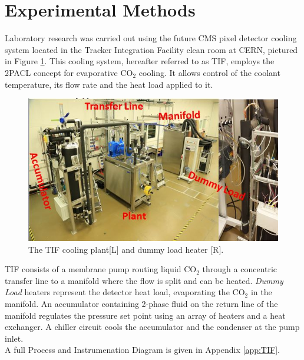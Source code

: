 \documentclass{report}
\begin{document}
\section{Experimental Methods}
\FloatBarrier
Laboratory research was carried out using the future CMS pixel detector cooling system located in the Tracker Integration Facility clean room at CERN, pictured in Figure \ref{fig:TIF}. This cooling system, hereafter referred to as TIF, employs the 2PACL concept for evaporative CO$_2$ cooling. It allows control of the coolant temperature, its flow rate and the heat load applied to  it. \\
\begin{figure}[h]
\includegraphics[width=\textwidth]{TIFandHeater.jpg}
\caption{The TIF cooling plant[L] and dummy load heater [R]. \cite{tif web}}
\label{fig:TIF}
\end{figure}
TIF consists of a membrane pump routing liquid CO$_2$ through a concentric transfer line to a manifold where the flow is split and can be heated. \textit{Dummy Load} heaters represent the detector heat load, evaporating the CO$_2$ in the manifold. An accumulator containing 2-phase fluid on the return line of the manifold regulates the pressure set point using an array of heaters and a heat exchanger. A chiller circuit cools the accumulator and the condenser at the pump inlet.\\
A full Process and Instrumenation Diagram is given in Appendix \ref{app:TIF}.

\FloatBarrier
\end{document}
